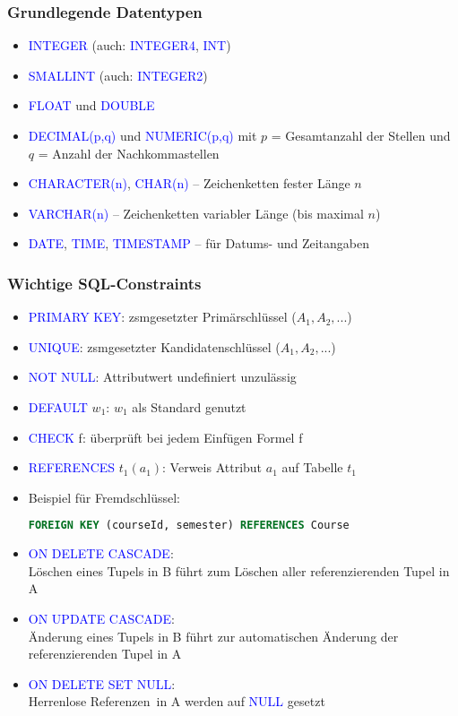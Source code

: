 \documentclass[12pt,a4paper]{article}
\begin{document}
\subsubsection{Grundlegende Datentypen}

\begin{itemize}
\item \textcolor{blue}{INTEGER} (auch: \textcolor{blue}{INTEGER4}, \textcolor{blue}{INT})
\item \textcolor{blue}{SMALLINT} (auch: \textcolor{blue}{INTEGER2})
\item \textcolor{blue}{FLOAT} und \textcolor{blue}{DOUBLE}
\item \textcolor{blue}{DECIMAL(p,q)} und \textcolor{blue}{NUMERIC(p,q)} mit $p$ = Gesamtanzahl der Stellen und $q$ = Anzahl der Nachkommastellen
\item \textcolor{blue}{CHARACTER(n)}, \textcolor{blue}{CHAR(n)} – Zeichenketten fester Länge $n$
\item \textcolor{blue}{VARCHAR(n)} – Zeichenketten variabler Länge (bis maximal $n$)
\item \textcolor{blue}{DATE}, \textcolor{blue}{TIME}, \textcolor{blue}{TIMESTAMP} – für Datums- und Zeitangaben
\end{itemize}

\subsubsection{Wichtige SQL-Constraints}

\begin{itemize}
\item  \textcolor{blue}{PRIMARY KEY}: zsmgesetzter Primärschlüssel ($A_1, A_2, ...$) 
\item \textcolor{blue}{UNIQUE}: zsmgesetzter Kandidatenschlüssel ($A_1, A_2, ...$) 
\item \textcolor{blue}{NOT NULL}: Attributwert undefiniert unzulässig
\item \textcolor{blue}{DEFAULT} $w_1$: $w_1$ als Standard genutzt 
\item \textcolor{blue}{CHECK} f: überprüft bei jedem Einfügen Formel f
\item \textcolor{blue}{REFERENCES} $t_1(a_1)$: Verweis Attribut $a_1$ auf Tabelle $t_1$
\item Beispiel für Fremdschlüssel:
\begin{lstlisting}[language = SQL]
FOREIGN KEY (courseId, semester) REFERENCES Course
\end{lstlisting}
\item \textcolor{blue}{ON DELETE CASCADE}: \\
Löschen eines Tupels in B führt zum Löschen aller referenzierenden Tupel in A
\item \textcolor{blue}{ON UPDATE CASCADE}: \\
Änderung eines Tupels in B führt zur automatischen Änderung der referenzierenden Tupel in A
\item \textcolor{blue}{ON DELETE SET NULL}: \\
\glqq Herrenlose Referenzen\grqq ~in A werden auf \textcolor{blue}{NULL} gesetzt
\end{itemize}
\end{document}

